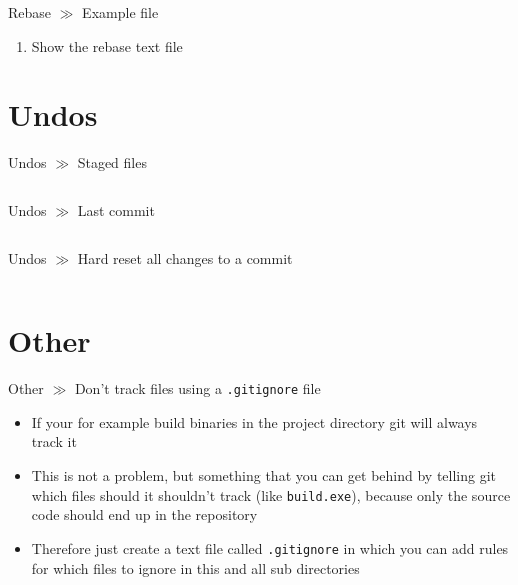 \documentclass[10pt]{beamer}
\begin{document}
\begin{frame}{Rebase $\gg$ Example file}
\begin{center}
	\begin{enumerate}
		\item Show the rebase text file
	\end{enumerate}
\end{center}
\end{frame}

\section{Undos}

\begin{frame}{Undos $\gg$ Staged files}
\inputminted[bgcolor=lightGreyCustom,fontsize=\scriptsize]{sh}{./resources/git_undos_01_stage_files.sh}
\end{frame}

\begin{frame}{Undos $\gg$ Last commit}
\inputminted[bgcolor=lightGreyCustom,fontsize=\scriptsize]{sh}{./resources/git_undos_02_last_commit.sh}
\end{frame}

\begin{frame}{Undos $\gg$ Hard reset all changes to a commit}
\inputminted[bgcolor=lightGreyCustom,fontsize=\scriptsize]{sh}{./resources/git_undos_03_hard_reset.sh}
\end{frame}


\section{Other}

\begin{frame}{Other $\gg$ Don't track files using a \texttt{.gitignore} file}
\begin{itemize}
	\item If your for example build binaries in the project directory git will always track it
	\item This is not a problem, but something that you can get behind by telling git which files should it shouldn't track (like \texttt{build.exe}), because only the source code should end up in the repository
	\item Therefore just create a text file called \texttt{.gitignore} in which you can add rules for which files to ignore in this and all sub directories
	\inputminted[bgcolor=lightGreyCustom,fontsize=\scriptsize]{sh}{./resources/.gitignore}
\end{itemize}
\end{frame}
\end{document}
